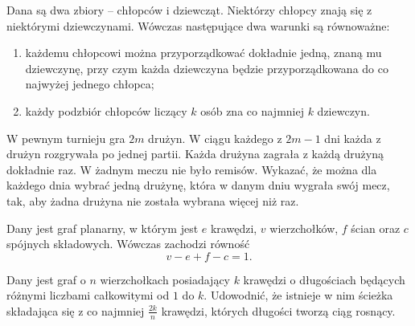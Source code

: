 



\noindent
Dana są dwa zbiory -- chłopców i dziewcząt. Niektórzy chłopcy znają się z niektórymi dziewczynami. Wówczas następujące dwa warunki są równoważne:
\begin{enumerate}
	\item każdemu chłopcowi można przyporządkować dokładnie jedną, znaną mu dziewczynę, przy czym każda dziewczyna będzie przyporządkowana do co najwyżej jednego chłopca;
	\item każdy podzbiór chłopców liczący $k$ osób zna co najmniej $k$ dziewczyn.
\end{enumerate}




\noindent
W pewnym turnieju gra $2m$ drużyn. W ciągu każdego z $2m - 1$ dni każda z drużyn rozgrywała po jednej partii. Każda drużyna zagrała z każdą drużyną dokładnie raz. W żadnym meczu nie było remisów. Wykazać, że można dla każdego dnia wybrać jedną drużynę, która w danym dniu wygrała swój mecz, tak, aby żadna drużyna nie została wybrana więcej niż raz.








\noindent
Dany jest graf planarny, w którym jest $e$ krawędzi, $v$ wierzchołków, $f$ ścian oraz $c$ spójnych składowych. Wówczas zachodzi równość
\[
	v - e + f - c = 1.
\]





\noindent
Dany jest graf o $n$ wierzchołkach posiadający $k$ krawędzi o długościach
będących różnymi liczbami całkowitymi od $1$ do $k$. Udowodnić, że istnieje w
nim ścieżka składająca się z co najmniej $\frac{2k}{n}$ krawędzi, których długości tworzą ciąg rosnący.

